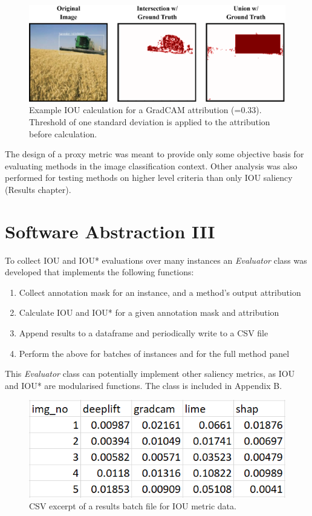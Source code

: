 \documentclass[main]{subfiles}
\begin{document}
\begin{figure}[htbp]
\centering
\includegraphics[scale=0.22]{iou_example.png}
\caption{Example IOU calculation for a GradCAM attribution  (=0.33). Threshold of one standard deviation is applied to the attribution before calculation.}
\label{iou_example_img}
\end{figure}

\newpage

The design of a proxy metric was meant to provide only some objective basis for evaluating methods in the image classification context. Other analysis was also performed for testing methods on higher level criteria than only IOU saliency (Results chapter).


\section{Software Abstraction III}  \label{sec:sw3}

To collect IOU and IOU* evaluations over many instances an \textit{Evaluator} class was developed that implements the following functions:
\begin{enumerate}
\item Collect annotation mask for an instance, and a method's output attribution
\item Calculate IOU and IOU* for a given annotation mask and attribution
\item Append results to a dataframe and periodically write to a CSV file
\item Perform the above for batches of instances and for the full method panel
\end{enumerate}

This \textit{Evaluator} class can potentially implement other saliency metrics, as IOU and IOU* are modularised functions. The class is included in Appendix B.

\begin{figure}[htbp]
\centering
\includegraphics[scale=0.4]{csv_output.png}
\caption{CSV excerpt of a results batch file for IOU metric data.}
\label{csv_image}
\end{figure}
\end{document}
